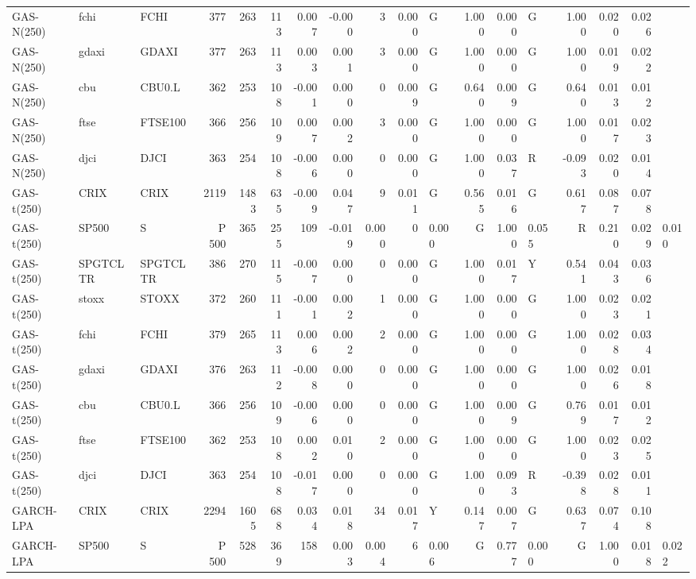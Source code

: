 \begin{table}[H]
\begin{tabular}{lllrrrrrrrlrrlrrr}
GAS-N(250) & fchi & FCHI & 377 & 263 & 113 & 0.007 & -0.000 & 3 & 0.000 & G & 1.000 & 0.000 & G & 1.000 & 0.020 & 0.026 \\
GAS-N(250) & gdaxi & GDAXI & 377 & 263 & 113 & 0.003 & 0.001 & 3 & 0.000 & G & 1.000 & 0.000 & G & 1.000 & 0.019 & 0.022 \\
GAS-N(250) & cbu & CBU0.L & 362 & 253 & 108 & -0.001 & 0.000 & 0 & 0.009 & G & 0.640 & 0.009 & G & 0.640 & 0.013 & 0.012 \\
GAS-N(250) & ftse & FTSE100 & 366 & 256 & 109 & 0.007 & 0.002 & 3 & 0.000 & G & 1.000 & 0.000 & G & 1.000 & 0.017 & 0.023 \\
GAS-N(250) & djci & DJCI & 363 & 254 & 108 & -0.006 & 0.000 & 0 & 0.000 & G & 1.000 & 0.037 & R & -0.093 & 0.020 & 0.014 \\
GAS-t(250) & CRIX & CRIX & 2119 & 1483 & 635 & -0.009 & 0.047 & 9 & 0.011 & G & 0.565 & 0.016 & G & 0.617 & 0.087 & 0.078 \\
GAS-t(250) & SP500 & S&P 500 & 365 & 255 & 109 & -0.019 & 0.000 & 0 & 0.000 & G & 1.000 & 0.055 & R & 0.210 & 0.029 & 0.010 \\
GAS-t(250) & SPGTCLTR & SPGTCLTR & 386 & 270 & 115 & -0.007 & 0.000 & 0 & 0.000 & G & 1.000 & 0.017 & Y & 0.541 & 0.043 & 0.036 \\
GAS-t(250) & stoxx & STOXX & 372 & 260 & 111 & -0.001 & 0.002 & 1 & 0.000 & G & 1.000 & 0.000 & G & 1.000 & 0.023 & 0.021 \\
GAS-t(250) & fchi & FCHI & 379 & 265 & 113 & 0.006 & 0.002 & 2 & 0.000 & G & 1.000 & 0.000 & G & 1.000 & 0.028 & 0.034 \\
GAS-t(250) & gdaxi & GDAXI & 376 & 263 & 112 & -0.008 & 0.000 & 0 & 0.000 & G & 1.000 & 0.000 & G & 1.000 & 0.026 & 0.018 \\
GAS-t(250) & cbu & CBU0.L & 366 & 256 & 109 & -0.006 & 0.000 & 0 & 0.000 & G & 1.000 & 0.009 & G & 0.769 & 0.017 & 0.012 \\
GAS-t(250) & ftse & FTSE100 & 362 & 253 & 108 & 0.002 & 0.010 & 2 & 0.000 & G & 1.000 & 0.000 & G & 1.000 & 0.023 & 0.025 \\
GAS-t(250) & djci & DJCI & 363 & 254 & 108 & -0.017 & 0.000 & 0 & 0.000 & G & 1.000 & 0.093 & R & -0.398 & 0.028 & 0.011 \\
GARCH-LPA & CRIX & CRIX & 2294 & 1605 & 688 & 0.034 & 0.018 & 34 & 0.017 & Y & 0.147 & 0.007 & G & 0.637 & 0.074 & 0.108 \\
GARCH-LPA & SP500 & S&P 500 & 528 & 369 & 158 & 0.003 & 0.004 & 6 & 0.006 & G & 0.777 & 0.000 & G & 1.000 & 0.018 & 0.022 \\

\end{tabular}
\end{table}
